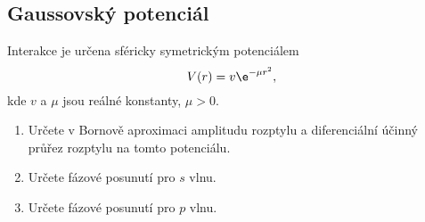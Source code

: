 \subsection{Gaussovský potenciál}
	Interakce je určena sféricky symetrickým potenciálem
	\begin{equation}
		V(r)=v\e^{-\mu r^{2}},
	\end{equation}
	kde $v$ a $\mu$ jsou reálné konstanty, $\mu>0$.
	
	\begin{enumerate}
	\item 
		Určete v Bornově aproximaci amplitudu rozptylu a diferenciální účinný průřez rozptylu na tomto potenciálu.
		
	\item 
		Určete fázové posunutí pro $s$ vlnu.
				
	\item
		Určete fázové posunutí pro $p$ vlnu.
	\end{enumerate}
	
